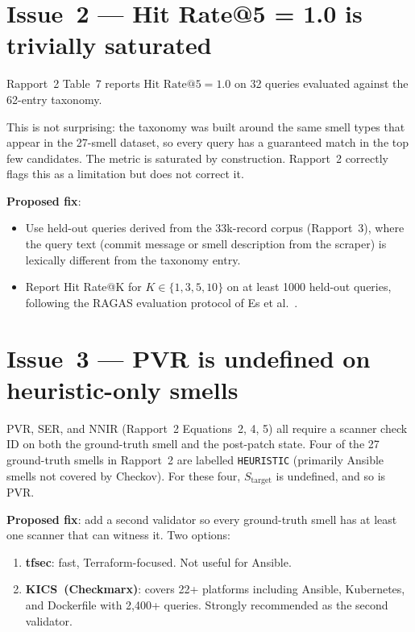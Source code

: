 \documentclass[11pt, a4paper]{report}
\begin{document}
\section{Issue~2 --- Hit Rate@5 = 1.0 is trivially saturated}

Rapport~2 Table~7 reports $\text{Hit Rate}@5 = 1.0$ on 32 queries
evaluated against the 62-entry taxonomy.

This is not surprising: the taxonomy was built around the same smell types
that appear in the 27-smell dataset, so every query has a guaranteed match
in the top few candidates. The metric is saturated by construction.
Rapport~2 correctly flags this as a limitation but does not correct it.

\textbf{Proposed fix}:

\begin{itemize}
  \item Use held-out queries derived from the 33k-record corpus
        (Rapport~3), where the query text (commit message or smell
        description from the scraper) is lexically different from the
        taxonomy entry.
  \item Report Hit Rate@K for $K \in \{1, 3, 5, 10\}$ on at least 1000
        held-out queries, following the RAGAS evaluation protocol of
        Es et al.~\citep{es2024ragas}.
\end{itemize}

\section{Issue~3 --- PVR is undefined on heuristic-only smells}

PVR, SER, and NNIR (Rapport~2 Equations~2, 4, 5) all require a scanner
check ID on both the ground-truth smell and the post-patch state. Four of
the 27 ground-truth smells in Rapport~2 are labelled \texttt{HEURISTIC}
(primarily Ansible smells not covered by Checkov). For these four,
$S_{\text{target}}$ is undefined, and so is PVR.

\textbf{Proposed fix}: add a second validator so every ground-truth smell
has at least one scanner that can witness it. Two options:

\begin{enumerate}
  \item \textbf{tfsec}: fast, Terraform-focused. Not useful for Ansible.
  \item \textbf{KICS~(Checkmarx)}: covers 22+ platforms including Ansible,
        Kubernetes, and Dockerfile with 2{,}400+ queries. Strongly
        recommended as the second validator.
\end{enumerate}
\end{document}
